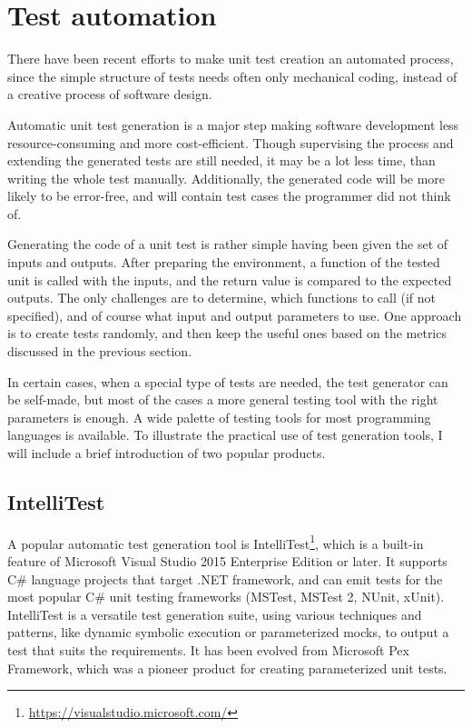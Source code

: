 \section{Test automation}

There have been recent efforts to make unit test creation an automated process, since the simple structure of tests needs often only mechanical coding, instead of a creative process of software design. 

Automatic unit test generation is a major step making software development less resource-consuming and more cost-efficient. Though supervising the process and extending the generated tests are still needed, it may be a lot less time, than writing the whole test manually. Additionally, the generated code will be more likely to be error-free, and will contain test cases the programmer did not think of.

Generating the code of a unit test is rather simple having been given the set of inputs and outputs. After preparing the environment, a function of the tested unit is called with the inputs, and the return value is compared to the expected outputs. The only challenges are to determine, which functions to call (if not specified), and of course what input and output parameters to use. One approach is to create tests randomly, and then keep the useful ones based on the metrics discussed in the previous section.

In certain cases, when a special type of tests are needed, the test generator can be self-made, but most of the cases a more general testing tool with the right parameters is enough. A wide palette of testing tools for most programming languages is available. To illustrate the practical use of test generation tools, I will include a brief introduction of two popular products.


\subsection{IntelliTest}
A popular automatic test generation tool is IntelliTest\footnote{\url{https://visualstudio.microsoft.com/}}, which is a built-in feature of Microsoft Visual Studio 2015 Enterprise Edition or later. It supports C\# language projects that target .NET framework, and can emit tests for the most popular C\# unit testing frameworks (MSTest, MSTest 2, NUnit, xUnit). IntelliTest is a versatile test generation suite, using various techniques and patterns, like dynamic symbolic execution or parameterized mocks, to output a test that suits the requirements. It has been evolved from Microsoft Pex Framework, which was a pioneer product for creating parameterized unit tests.  \cite{advances-in-unit-testing-theory-and-practice, intellitest_manual}
